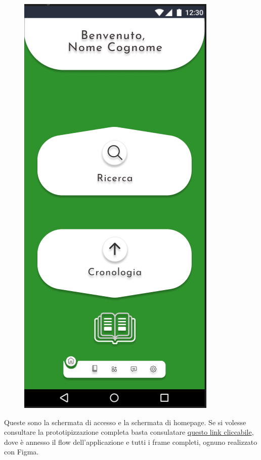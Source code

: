 \begin{figure}
\begin{minipage}{.5\textwidth}
\includegraphics[width=.60\textwidth]{Immagini/Alexandria/Screen/homepage.PNG} 

\end{minipage}
\end{figure}

Queste sono la schermata di accesso e la schermata di homepage. Se si volesse consultare la prototipizzazione completa basta consulatare \href{https://www.figma.com/file/O9LZ0W5HYZAW2BCnP167fL/Alexandria?node-id=0%3A1&t=rqKqdyohunSYcSgf-1}{questo link cliccabile}, dove è annesso il flow dell'applicazione e tutti i frame completi, ognuno realizzato con Figma.


